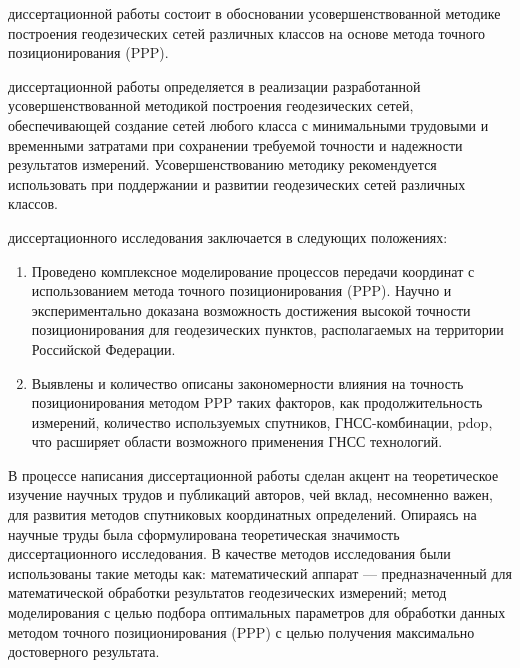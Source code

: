 {\theoretical}
диссертационной работы состоит в обосновании усовершенствованной методике построения геодезических сетей различных классов на основе метода точного позиционирования (PPP).

{\influence} диссертационной работы определяется в реализации разработанной усовершенствованной методикой построения геодезических сетей, обеспечивающей создание сетей любого класса с минимальными трудовыми и временными затратами при сохранении требуемой точности и надежности результатов измерений. Усовершенствованию методику рекомендуется использовать при поддержании и развитии геодезических сетей различных классов. 


{\novelty} диссертационного исследования заключается в следующих положениях:
\begin{enumerate}[beginpenalty=10000] %
	\item Проведено комплексное моделирование процессов передачи координат с использованием метода точного позиционирования (PPP). Научно и экспериментально доказана возможность достижения высокой точности позиционирования для геодезических пунктов, располагаемых на территории Российской Федерации.
	\item Выявлены и количество описаны закономерности влияния на точность позиционирования методом PPP таких факторов, как продолжительность измерений, количество используемых спутников, ГНСС-комбинации, pdop, что расширяет области возможного применения ГНСС технологий.
\end{enumerate}

{\methods}
В процессе написания диссертационной работы сделан акцент на теоретическое изучение научных трудов и публикаций авторов, чей вклад, несомненно важен, для развития методов спутниковых координатных определений. Опираясь на научные труды была сформулирована теоретическая значимость диссертационного исследования. В качестве методов исследования были использованы такие методы как: математический аппарат --– предназначенный для математической обработки результатов геодезических измерений; метод моделирования с целью подбора оптимальных параметров для обработки данных методом точного позиционирования (PPP) с целью получения максимально достоверного результата.

